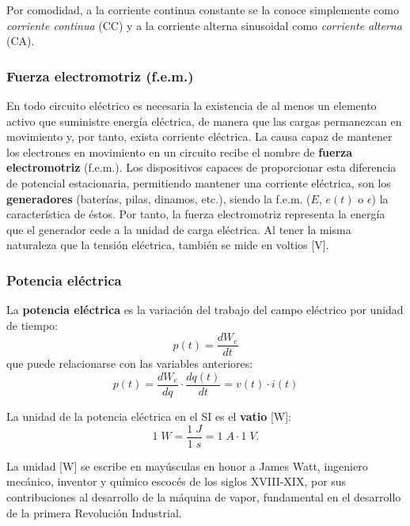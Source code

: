 \documentclass[11pt]{book} %
\begin{document}
	Por comodidad, a la corriente continua constante se la conoce simplemente como \textit{corriente continua} (CC) y a la corriente alterna sinusoidal como \textit{corriente alterna} (CA).
	
	
	\subsubsection{Fuerza electromotriz (f.e.m.)}
	En todo circuito eléctrico es necesaria la existencia de al menos un elemento activo que suministre energía eléctrica, de manera que las cargas permanezcan en movimiento y, por tanto, exista corriente eléctrica. La causa capaz de mantener los electrones en movimiento en un circuito recibe el nombre de \textbf{fuerza electromotriz} (f.e.m.). Los dispositivos capaces de proporcionar esta diferencia de potencial estacionaria, permitiendo mantener una corriente eléctrica, son los \textbf{generadores} (baterías, pilas, dinamos, etc.), siendo la f.e.m. ($E$, $e(t)$ o $\epsilon$) la característica de éstos.  Por tanto, la fuerza electromotriz representa la energía que el generador cede a la unidad de carga eléctrica. Al tener la misma naturaleza que la tensión eléctrica, también se mide en voltios [V]. 
	
	\subsubsection{Potencia eléctrica}
	La \textbf{potencia eléctrica} es la variación del trabajo del campo eléctrico por unidad de tiempo:
	\begin{equation*}
		p(t)=\frac{dW_{e}}{dt} 
	\end{equation*}
	que puede relacionarse con las variables anteriores:
	\begin{equation*}\label{eq.pvi}
		p(t) = \frac{dW_e}{dq} \cdot \frac{dq(t)}{dt}= v(t)\cdot i(t)
	\end{equation*}
	
	La {unidad} de la potencia eléctrica en el SI es el \textbf{vatio} [W]: 
	\begin{equation*}
		1\;W = \dfrac{1\;J}{1\;s}= 1\;A\cdot 1\;V.
	\end{equation*}
	\begin{remark}
		La unidad [W] se escribe en mayúsculas en honor a James Watt, ingeniero mecánico, inventor y químico escocés de los siglos XVIII-XIX, por sus contribuciones al desarrollo de la máquina de vapor, fundamental en el desarrollo de la primera Revolución Industrial.
	\end{remark}
	
\end{document}
